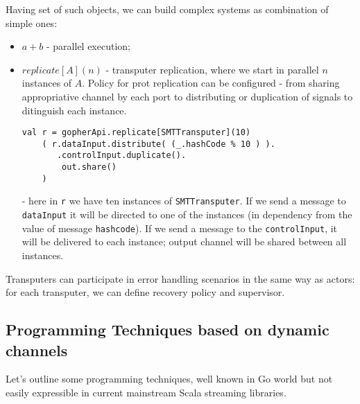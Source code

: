 \documentclass[12pt]{article}
\begin{document}
  Having set of such objects, we can build complex systems as combination of simple ones:
  \begin{itemize}
    \item $a+b$ - parallel execution; 
    \item $replicate[A](n)$ - transputer replication, where we start in parallel $n$ instances
  of $A$. Policy for prot replication can be configured - from sharing appropriative channel by each port to distributing   or duplication of signals to ditinguish each instance.
\begin{Verbatim}[fontsize=\small]
 val r = gopherApi.replicate[SMTTransputer](10)
    ( r.dataInput.distribute( (_.hashCode % 10 ) ).
       .controlInput.duplicate().
        out.share()
    )
\end{Verbatim}
    - here in \verb|r| we have ten instances of \verb|SMTTransputer|. If we send a message to \verb|dataInput| it will be directed to one of the instances (in dependency from the value of message \verb|hashcode|). If we send a message to the \verb|controlInput|, it will be delivered to each instance; output channel will be shared between all instances.
  \end{itemize}

  Transputers can participate in error handling scenarios in the same way as actors: for each transputer, we can define recovery policy and supervisor.

\subsection{ Programming Techniques based on dynamic channels  }

 Let's outline some programming techniques, well known in Go world but not easily expressible in current mainstream Scala streaming libraries. 
\end{document}
